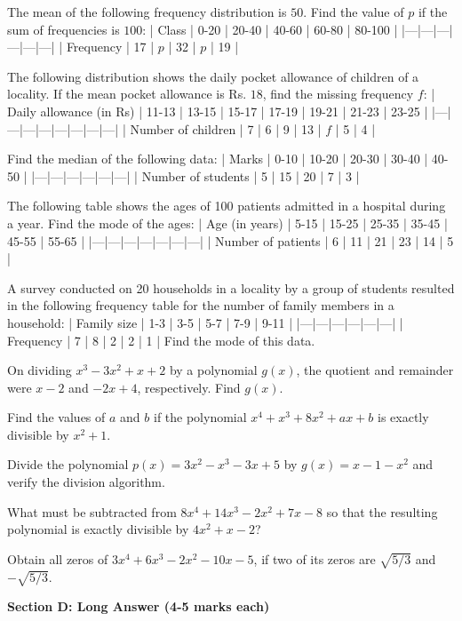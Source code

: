 \documentclass[12pt,a4paper]{exam}
\begin{document}
\begin{questions}
\question[3] The mean of the following frequency distribution is $50$. Find the value of $p$ if the sum of frequencies is $100$: 
| Class | 0-20 | 20-40 | 40-60 | 60-80 | 80-100 |
|---|---|---|---|---|---|
| Frequency | 17 | $p$ | 32 | $p$ | 19 |
\vspace{0.15cm}

\question[3] The following distribution shows the daily pocket allowance of children of a locality. If the mean pocket allowance is Rs. $18$, find the missing frequency $f$:
| Daily allowance (in Rs) | 11-13 | 13-15 | 15-17 | 17-19 | 19-21 | 21-23 | 23-25 |
|---|---|---|---|---|---|---|---|
| Number of children | 7 | 6 | 9 | 13 | $f$ | 5 | 4 |
\vspace{0.15cm}

\question[3] Find the median of the following data:
| Marks | 0-10 | 10-20 | 20-30 | 30-40 | 40-50 |
|---|---|---|---|---|---|
| Number of students | 5 | 15 | 20 | 7 | 3 |
\vspace{0.15cm}

\question[3] The following table shows the ages of 100 patients admitted in a hospital during a year. Find the mode of the ages:
| Age (in years) | 5-15 | 15-25 | 25-35 | 35-45 | 45-55 | 55-65 |
|---|---|---|---|---|---|---|
| Number of patients | 6 | 11 | 21 | 23 | 14 | 5 |
\vspace{0.15cm}

\question[3] A survey conducted on 20 households in a locality by a group of students resulted in the following frequency table for the number of family members in a household:
| Family size | 1-3 | 3-5 | 5-7 | 7-9 | 9-11 |
|---|---|---|---|---|---|
| Frequency | 7 | 8 | 2 | 2 | 1 | 
Find the mode of this data.
\vspace{0.15cm}

\question[3] On dividing $x^3 - 3x^2 + x + 2$ by a polynomial $g(x)$, the quotient and remainder were $x - 2$ and $-2x + 4$, respectively. Find $g(x)$.
\vspace{0.15cm}

\question[3] Find the values of $a$ and $b$ if the polynomial $x^4 + x^3 + 8x^2 + ax + b$ is exactly divisible by $x^2 + 1$.
\vspace{0.15cm}

\question[3] Divide the polynomial $p(x) = 3x^2 - x^3 - 3x + 5$ by $g(x) = x - 1 - x^2$ and verify the division algorithm.
\vspace{0.15cm}

\question[3] What must be subtracted from $8x^4 + 14x^3 - 2x^2 + 7x - 8$ so that the resulting polynomial is exactly divisible by $4x^2 + x - 2$?
\vspace{0.15cm}

\question[3] Obtain all zeros of $3x^4 + 6x^3 - 2x^2 - 10x - 5$, if two of its zeros are $\sqrt{5/3}$ and $-\sqrt{5/3}$.
\vspace{0.15cm}

\end{questions}
\bigskip
\noindent\textbf{\large Section D: Long Answer (4-5 marks each)}
\end{document}
